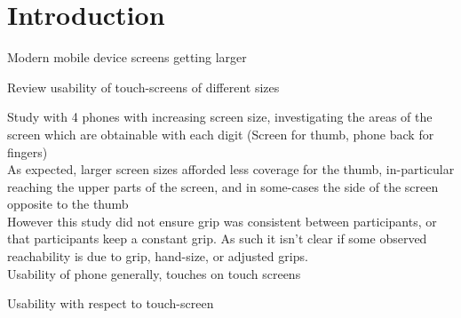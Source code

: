 \section{Introduction}


%




\cite{xuesheng2018research} Modern mobile device screens getting larger

\cite{tsai2017testing} Review usability of touch-screens of different sizes

\cite{le2018fingers} Study with 4 phones with increasing screen size, investigating the areas of the screen which are obtainable with each digit (Screen for thumb, phone back for fingers)\\
As expected, larger screen sizes afforded less coverage for the thumb, in-particular reaching the upper parts of the screen, and in some-cases the side of the screen opposite to the thumb\\
However this study did not ensure grip was consistent between participants, or that participants keep a constant grip. As such it isn't clear if some observed reachability is due to grip, hand-size, or adjusted grips.\\

\cite{punchoojit2017usability} Usability of phone generally, touches on touch screens

\cite{raptis2013does} Usability with respect to touch-screen

